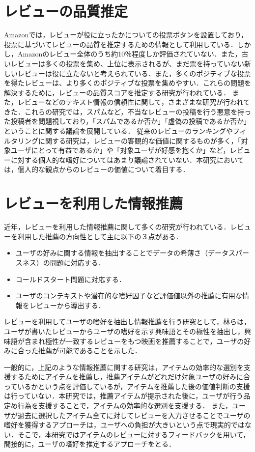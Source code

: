 \documentclass[a4paper,11pt,oneside,openany]{jsbook}
\begin{document}
	\section{レビューの品質推定}
Amazonでは，レビューが役に立ったかについての投票ボタンを設置しており，投票に基づいてレビューの品質を推定するための情報として利用している．しかし，Amazonのレビュー全体のうち約10％程度しか評価されていない\cite{amazon}．また，古いレビューは多くの投票を集め、上位に表示されるが、まだ票を持っていない新しいレビューは役に立たないと考えられている\cite{Moghaddam}．また，多くのポジティブな投票を得たレビューは、より多くのポジティブな投票を集めやすい．これらの問題を解決するために，レビューの品質スコアを推定する研究が行われている\cite{Raghavan}．
また，レビューなどのテキスト情報の信頼性に関して，さまざまな研究が行われてきた\cite{iki,muk,xie,wang}．これらの研究では，スパムなど，不当なレビューの投稿を行う悪意を持った投稿者を問題視しており，「スパムであるか否か」「虚偽の投稿であるか否か」ということに関する議論を展開している．
従来のレビューのランキングやフィルタリングに関する研究は，レビューの客観的な価値に関するものが多く，「対象ユーザにとって有益であるか」や「対象ユーザが好感を抱くか」など，レビューに対する個人的な嗜好についてはあまり議論されていない．本研究においては，個人的な観点からのレビューの価値について着目する．

	\section{レビューを利用した情報推薦}
近年，レビューを利用した情報推薦に関して多くの研究が行われている．レビューを利用した推薦の方向性として主に以下の３点がある\cite{Li}．
\begin{itemize}
 \item ユーザの好みに関する情報を抽出することでデータの希薄さ（データスパースネス）の問題に対応する．
 \item コールドスタート問題に対応する．
 \item ユーザのコンテキストや潜在的な嗜好因子など評価値以外の推薦に有用な情報をレビューから導出する．
\end{itemize}
\par
レビューを利用してユーザの嗜好を抽出し情報推薦を行う研究として，林ら\cite{hayashi}は，ユーザが書いたレビューからユーザの嗜好を示す興味語とその極性を抽出し，興味語が含まれ極性が一致するレビューをもつ映画を推薦することで，ユーザの好みに合った推薦が可能であることを示した．
\par
一般的に，上記のような情報推薦に関する研究は，アイテムの効率的な選別を支援するためにアイテムを推薦し，推薦アイテムがどれだけ対象ユーザの好みに合っているかという点を評価しているが，アイテムを推薦した後の価値判断の支援は行っていない．本研究では，推薦アイテムが提示された後に，ユーザが行う品定め行為を支援することで，アイテムの効率的な選別を支援する．
また，ユーザが過去に選択したアイテム全てに対してレビューを入力させることでユーザの嗜好を獲得するアプローチは，ユーザへの負担が大きいという点で現実的ではない．そこで，本研究ではアイテムのレビューに対するフィードバックを用いて，間接的に，ユーザの嗜好を推定するアプローチをとる．
\end{document}
